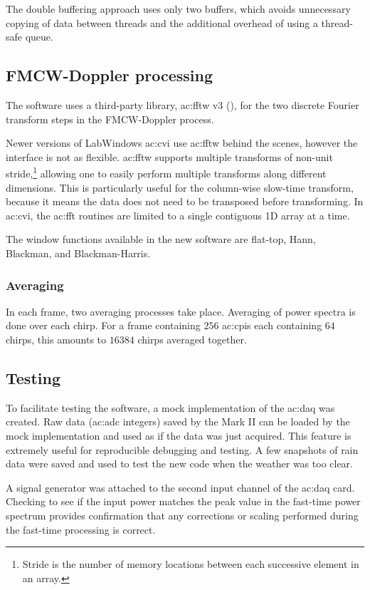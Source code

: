 \documentclass{article}
\begin{document}
The double buffering approach uses only two buffers, which avoids unnecessary copying of data between threads and the additional overhead of using a thread-safe queue.

\subsection{FMCW-Doppler processing}
The software uses a third-party library, \acrshort{ac:fftw} v3 (\cite{FFTWv3}), for the two discrete Fourier transform steps in the FMCW-Doppler process.

Newer versions of LabWindows \acrshort{ac:cvi} use \acrshort{ac:fftw} behind the scenes, however the interface is not as flexible. \acrshort{ac:fftw} supports multiple transforms of non-unit stride,\footnote{Stride is the number of memory locations between each successive element in an array.} allowing one to easily perform multiple transforms along different dimensions. This is particularly useful for the column-wise slow-time transform, because it means the data does not need to be transposed before transforming. In \acrshort{ac:cvi}, the \acrshort{ac:fft} routines are limited to a single contiguous 1D array at a time.

The window functions available in the new software are flat-top, Hann, Blackman, and Blackman-Harris.

\subsubsection{Averaging}
In each frame, two averaging processes take place. Averaging of power spectra is done over each chirp. For a frame containing \(256\) \acrshort{ac:cpi}s each containing \(64\) chirps, this amounts to \(16384\) chirps averaged together. 

\subsection{Testing}
To facilitate testing the software, a mock implementation of the \acrshort{ac:daq} was created. Raw data (\acrshort{ac:adc} integers) saved by the Mark II can be loaded by the mock implementation and used as if the data was just acquired. This feature is extremely useful for reproducible debugging and testing. A few snapshots of rain data were saved and used to test the new code when the weather was too clear.

A signal generator was attached to the second input channel of the \acrshort{ac:daq} card. Checking to see if the input power matches the peak value in the fast-time power spectrum provides confirmation that any corrections or scaling performed during the fast-time processing is correct.
\end{document}
